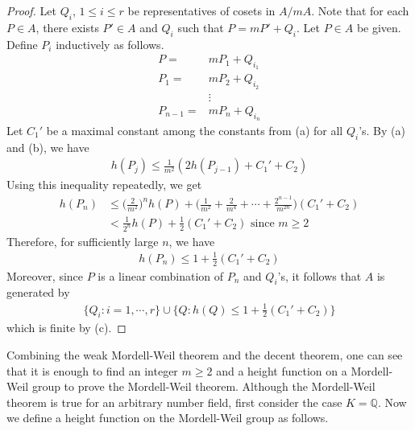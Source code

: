 \documentclass[12pt]{article}
\newcommand{\<}{\langle}
\renewcommand{\>}{\rangle}
\numberwithin{equation}{section}
\theoremstyle{plain}
\theoremstyle{definition}
\begin{document}
\begin{proof}
    Let \( Q_i \), \( 1 \leq i \leq r \) be representatives of cosets in \(A/mA\). Note that for each \(P \in A\), there exists \( P'\in A \) and \(Q_i\) such that \( P = mP' + Q_i \). Let \(P \in A\) be given. Define \(P_i\) inductively as follows.
    \begin{align*}
        P   =& mP_1 + Q_{i_1}\\
        P_1 =& mP_2 + Q_{i_2}\\
            &\vdots \\
        P_{n-1} =& mP_n + Q_{i_n}
    \end{align*}
    Let \(C_1 '\) be a maximal constant among the constants from (a) for all \( Q_i\)'s. By (a) and (b), we have
    \begin{align*}
        h(P_j) \leq \frac{1}{m^2} (2h(P_{j-1}) + C_1 ' + C_2)
    \end{align*}
    Using this inequality repeatedly, we get
    \begin{align*}
        h(P_n) &\leq \Big(\frac{2}{m^2} \Big)^n h(P) + \Big( \frac{1}{m^2} + \frac{2}{m^4} + \cdots + \frac{2^{n-1}}{m^{2n}} \Big)(C_1'+ C_2) \\
        &< \frac{1}{2^n} h(P) + \frac{1}{2} (C_1'+C_2) \text{       since \(m \geq 2\)} 
    \end{align*}
    Therefore, for sufficiently large \( n \), we have
    \begin{align*}
        h(P_n) \leq 1 + \frac{1}{2} (C_1'+C_2) 
    \end{align*}
    Moreover, since \(P\) is a linear combination of \(P_n\) and \(Q_i\)'s, it follows that \(A\) is generated by
    \begin{align*}
        \{Q_i : i=1, \cdots, r \} \cup \{ Q : h(Q) \leq 1+ \frac{1}{2} (C_1'+C_2)\}
    \end{align*}
    which is finite by (c).
\end{proof}

Combining the weak Mordell-Weil theorem and the decent theorem, one can see that it is enough to find an integer \(m \geq 2\) and a height function on a Mordell-Weil group to prove the Mordell-Weil theorem. Although the Mordell-Weil theorem is true for an arbitrary number field, first consider the case \(K = \mathbb{Q}\). Now we define a height function on the Mordell-Weil group as follows. 
\end{document}
